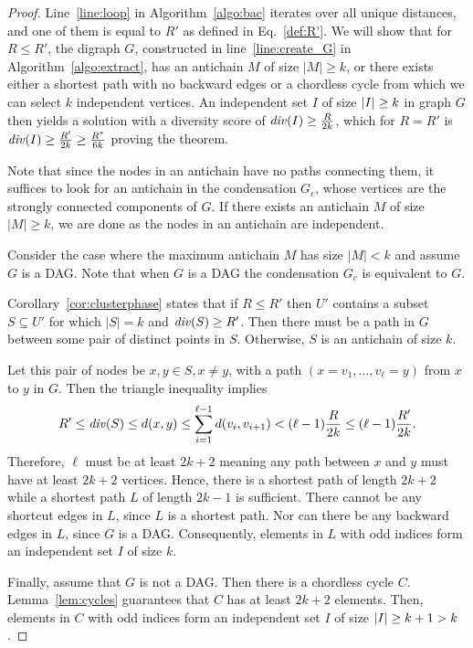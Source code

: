 \begin{proof}
Line~\ref{line:loop} in Algorithm~\ref{algo:bac} iterates over all unique distances, and one of them is equal to $R'$ as defined in Eq.~\ref{def:R'}.
We will show that for $R \leq R'$, the digraph $G$, constructed in line~\ref{line:create_G} in Algorithm~\ref{algo:extract}, has an antichain $M$ of size $|M| \geq k$, or there exists either a shortest path
with no backward edges or a chordless cycle from which we can select $k$ independent vertices. An independent set $I$ of size ${\left|I\right|} \geq k$ in graph $G$ then yields a solution with a diversity score of $\diver{I} \geq \frac{R}{2k}$, which for $R = R'$ is $\diver{I} \geq\frac{R'}{2k} \geq \frac{R^*}{6k}$ proving the theorem. 

Note that since the nodes in an antichain have no paths connecting them, it suffices to look for an antichain in the condensation $G_c$, whose vertices are the strongly connected components of $G$. If there exists an antichain $M$ of size $|M| \geq k$, we are done as the nodes in an antichain are independent. 

Consider the case where the maximum antichain $M$ has size $|M|<k$ and assume $G$ is a DAG. Note that when $G$ is a DAG the condensation $G_c$ is equivalent to $G$.

Corollary~\ref{cor:clusterphase} states that if $R \leq R'$ then ${U}'$ contains a subset
$S \subseteq {U}'$ for which $|S| = k$ and $\diver{S} \geq R'$. Then there must be a path in $G$ between some pair of distinct points in $S$. Otherwise, $S$ is an antichain of size $k$.

Let this pair of nodes be $x, y \in S, x \neq y$, with a path $(x = v_1, \ldots, v_\ell = y)$ from $x$ to $y$ in $G$.
Then the triangle inequality implies
\[
	R' \leq \diver{S} \leq d(x, y) \leq \sum_{i=1}^{\ell-1} d(v_i, v_{i + 1}) < (\ell - 1) \frac{R}{2k} \leq (\ell - 1) \frac{R'}{2k}.
\]
Therefore, $\ell$ must be at least $2k + 2$ meaning any path between $x$ and $y$ must have at least $2k + 2$ vertices. Hence, there is a shortest path of length $2k + 2$ while a shortest path $L$ of length $2k - 1$ is sufficient.
There cannot be any shortcut edges in $L$, since $L$ is a shortest path. Nor can there be any backward edges in $L$, since $G$ is a DAG.
Consequently, elements in $L$ with odd indices form an independent set $I$ of size $k$.

Finally, assume that $G$ is not a DAG. Then
there is a chordless cycle $C$. Lemma~\ref{lem:cycles} guarantees that $C$ has at least $2k + 2$ elements.
Then, elements in $C$ with odd indices form an independent set $I$ of size ${\left|I\right|} \geq k+1 > k$.
\end{proof}


